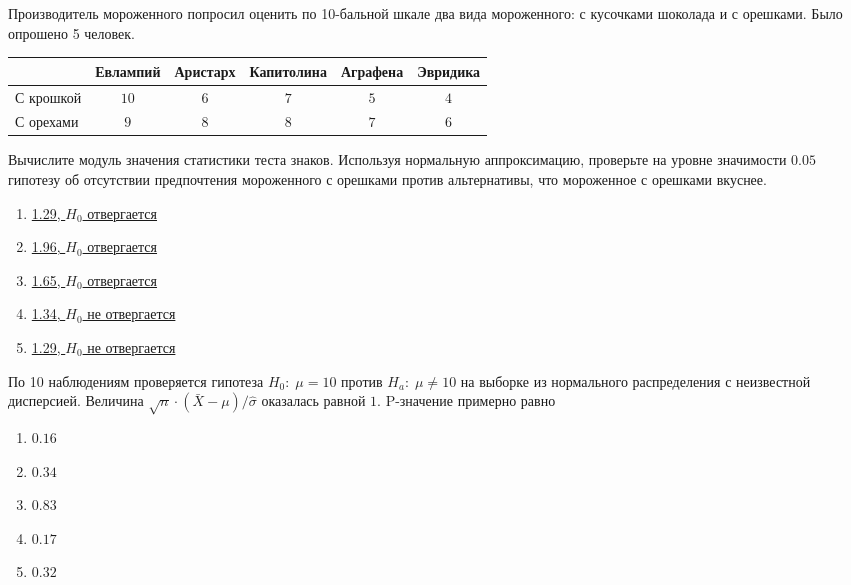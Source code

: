 \documentclass[t]{beamer}
\begin{document}
 \begin{frame} \label{31} 
\begin{block}{31} 
\small
 Производитель мороженного попросил оценить по 10-бальной шкале два вида мороженного: с кусочками шоколада и с орешками. Было опрошено 5 человек.

 \begin{tabular}{@{}lccccc@{}}
 \toprule
           & Евлампий & Аристарх & Капитолина & Аграфена & Эвридика \\ \midrule
 С крошкой & $10$     & $6$      & $7$        & $5$      & $4$      \\
 С орехами & $9$      & $8$      & $8$        & $7$      & $6$      \\ \bottomrule
 \end{tabular}

Вычислите модуль значения статистики теста знаков. Используя нормальную аппроксимацию, проверьте на уровне значимости $0.05$ гипотезу об отсутствии предпочтения мороженного с орешками против альтернативы, что мороженное с орешками вкуснее.
 


 \end{block} 
\begin{enumerate} 
\item[] \hyperlink{31-No}{\beamergotobutton{} 1.29, $H_0$ отвергается}
\item[] \hyperlink{31-No}{\beamergotobutton{} 1.96, $H_0$ отвергается}
\item[] \hyperlink{31-No}{\beamergotobutton{} 1.65, $H_0$ отвергается}
\item[] \hyperlink{31-Yes}{\beamergotobutton{} 1.34, $H_0$ не отвергается}
\item[] \hyperlink{31-No}{\beamergotobutton{} 1.29, $H_0$ не отвергается}
\end{enumerate} 
\end{frame} 


 \begin{frame} \label{32} 
\begin{block}{32} 

По 10 наблюдениям проверяется гипотеза $H_0: \; \mu=10$ против $H_a: \; \mu \neq 10$ на выборке из нормального распределения с неизвестной дисперсией. Величина $\sqrt{n}\cdot (\bar{X}-\mu)/\hat{\sigma}$ оказалась равной $1$. P-значение примерно равно
 


 \end{block} 
\begin{enumerate} 
\item[] \hyperlink{32-Yes}{\beamergotobutton{} $0.16$}
\item[] \hyperlink{32-No}{\beamergotobutton{} $0.34$}
\item[] \hyperlink{32-No}{\beamergotobutton{} $0.83$}
\item[] \hyperlink{32-No}{\beamergotobutton{} $0.17$}
\item[] \hyperlink{32-No}{\beamergotobutton{} $0.32$}
\end{enumerate} 
\end{frame} 
\end{document}
